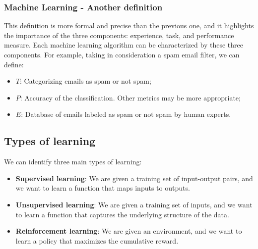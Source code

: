 \subsubsection{Machine Learning - Another definition}
This definition is more formal and precise than the previous one, and it highlights the importance of the three components: experience, task, and performance measure.
Each machine learning algorithm can be characterized by these three components. For example, taking in consideration a spam email filter, we can define:
\begin{itemize}
    \item $T$: Categorizing emails as spam or not spam;
    \item $P$: Accuracy of the classification. Other metrics may be more appropriate;
    \item $E$: Database of emails labeled as spam or not spam by human experts.
\end{itemize}

\subsection{Types of learning}
We can identify three main types of learning:
\begin{itemize}
    \item \textbf{Supervised learning}: We are given a training set of input-output pairs, and we want to learn a function that maps inputs to outputs.
    \item \textbf{Unsupervised learning}: We are given a training set of inputs, and we want to learn a function that captures the underlying structure of the data.
    \item \textbf{Reinforcement learning}: We are given an environment, and we want to learn a policy that maximizes the cumulative reward.
\end{itemize}

